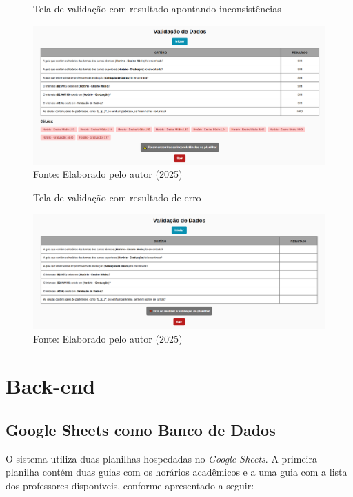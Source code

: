 \begin{itemize}
    \begin{figure}[H]
        \centering
        \caption{Tela de validação com resultado apontando inconsistências}
        \includegraphics[width=1\textwidth]{Figuras/front-23.png}
        \caption*{Fonte: Elaborado pelo autor (2025)}
        \label{fig_front_23}
    \end{figure}

    \begin{figure}[htb]
        \centering
        \caption{Tela de validação com resultado de erro}
        \includegraphics[width=1\textwidth]{Figuras/front-24.png}
        \caption*{Fonte: Elaborado pelo autor (2025)}
        \label{fig_front_24}
    \end{figure}
\end{itemize}

\section{Back-end}

\subsection{Google Sheets como Banco de Dados}

O sistema utiliza duas planilhas hospedadas no \textit{Google Sheets}. A primeira planilha contém duas guias com os horários acadêmicos e a uma guia com a lista dos professores disponíveis, conforme apresentado a seguir:

